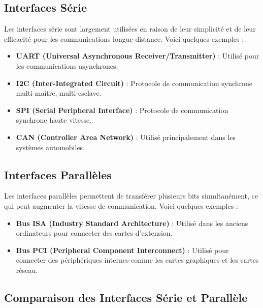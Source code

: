 \documentclass[10pt,a4paper]{article}
\begin{document}
\subsection*{Interfaces Série}

Les interfaces série sont largement utilisées en raison de leur simplicité et de leur efficacité pour les communications longue distance. Voici quelques exemples :
\begin{itemize}
    \item \textbf{UART (Universal Asynchronous Receiver/Transmitter)} : Utilisé pour les communications asynchrones.
    \item \textbf{I2C (Inter-Integrated Circuit)} : Protocole de communication synchrone multi-maître, multi-esclave.
    \item \textbf{SPI (Serial Peripheral Interface)} : Protocole de communication synchrone haute vitesse.
    \item \textbf{CAN (Controller Area Network)} : Utilisé principalement dans les systèmes automobiles.
\end{itemize}


\subsection*{Interfaces Parallèles}

Les interfaces parallèles permettent de transférer plusieurs bits simultanément, ce qui peut augmenter la vitesse de communication. Voici quelques exemples :
\begin{itemize}
    \item \textbf{Bus ISA (Industry Standard Architecture)} : Utilisé dans les anciens ordinateurs pour connecter des cartes d'extension.
    \item \textbf{Bus PCI (Peripheral Component Interconnect)} : Utilisé pour connecter des périphériques internes comme les cartes graphiques et les cartes réseau.
\end{itemize}


\subsection*{Comparaison des Interfaces Série et Parallèle}
\end{document}

